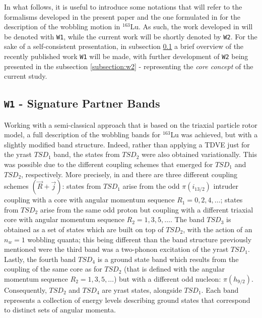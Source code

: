 \documentclass[11pt]{article}
\begin{document}
In what follows, it is useful to introduce some notations that will refer to the formalisms developed in the present paper and the one formulated in \cite{raduta2020towards} for the description of the wobbling motion in $^{163}$Lu. As such, the work developed in \cite{raduta2020towards} will be denoted with \texttt{W1}, while the current work will be shortly denoted by \texttt{W2}. For the sake of a self-consistent presentation, in subsection \ref{subsection:w1} a brief overview of the recently published work \texttt{W1} will be made, with further development of \texttt{W2} being presented in the subsection \ref{subsection:w2} - representing the \emph{core concept} of the current study.

\subsection{\texttt{W1} - Signature Partner Bands}
\label{subsection:w1}

Working with a semi-classical approach that is based on the triaxial particle rotor model, a full description of the wobbling bands for $^{163}$Lu was achieved, but with a slightly modified band structure. Indeed, rather than applying a TDVE just for the yrast $TSD_1$ band, the states from $TSD_2$ were also obtained variationally. This was possible due to the different coupling schemes that emerged for $TSD_1$ and $TSD_2$, respectively. More precisely, in \cite{raduta2020towards} and \cite{raduta2020approach} there are three different coupling schemes $(\vec{R}+\vec{j})$: states from $TSD_1$ arise from the odd $\pi(i_{13/2})$ intruder coupling with a core with angular momentum sequence $R_1=0,2,4,\dots$; states from $TSD_2$ arise from the same odd proton but coupling with a different triaxial core with angular momentum sequence $R_2=1,3,5,\dots$. The band $TSD_3$ is obtained as a set of states which are built on top of $TSD_2$, with the action of an $n_w=1$ wobbling quanta; this being different than the band structure previously mentioned were the third band was a two-phonon excitation of the yrast $TSD_1$. Lastly, the fourth band $TSD_4$ is a ground state band which results from the coupling of the same core as for $TSD_2$ (that is defined with the angular momentum sequence $R_2=1,3,5,\dots$) but with a different odd nucleon: $\pi(h_{9/2})$. Consequently, $TSD_2$ and $TSD_4$ are yrast states, alongside $TSD_1$. Each band represents a collection of energy levels describing ground states that correspond to distinct sets of angular momenta.
\end{document}
